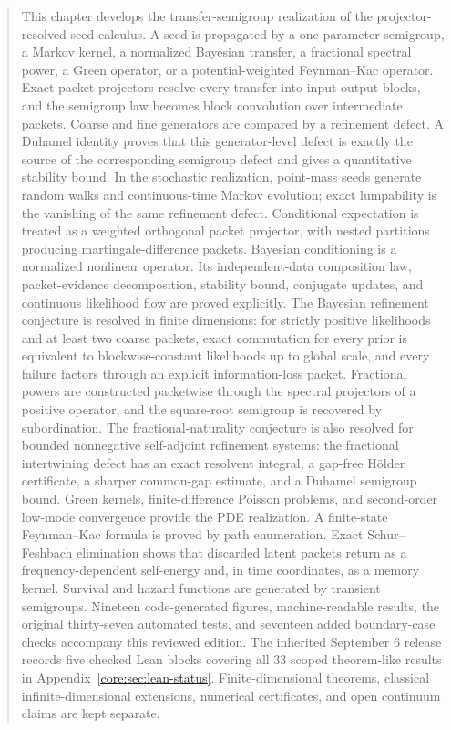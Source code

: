 \documentclass[11pt,letterpaper]{article}
\theoremstyle{plain}
\theoremstyle{plain}
\theoremstyle{plain}
\theoremstyle{definition}
\theoremstyle{definition}
\theoremstyle{definition}
\theoremstyle{definition}
\theoremstyle{definition}
\theoremstyle{remark}
\theoremstyle{remark}
\theoremstyle{remark}
\theoremstyle{remark}
\theoremstyle{remark}
\theoremstyle{remark}
\begin{document}
\begin{abstract}
This chapter develops the transfer-semigroup realization of the projector-resolved seed calculus. A seed is propagated by a one-parameter semigroup, a Markov kernel, a normalized Bayesian transfer, a fractional spectral power, a Green operator, or a potential-weighted Feynman--Kac operator. Exact packet projectors resolve every transfer into input-output blocks, and the semigroup law becomes block convolution over intermediate packets. Coarse and fine generators are compared by a refinement defect. A Duhamel identity proves that this generator-level defect is exactly the source of the corresponding semigroup defect and gives a quantitative stability bound. In the stochastic realization, point-mass seeds generate random walks and continuous-time Markov evolution; exact lumpability is the vanishing of the same refinement defect. Conditional expectation is treated as a weighted orthogonal packet projector, with nested partitions producing martingale-difference packets. Bayesian conditioning is a normalized nonlinear operator. Its independent-data composition law, packet-evidence decomposition, stability bound, conjugate updates, and continuous likelihood flow are proved explicitly.  The Bayesian refinement conjecture is resolved in finite dimensions: for strictly positive likelihoods and at least two coarse packets, exact commutation for every prior is equivalent to blockwise-constant likelihoods up to global scale, and every failure factors through an explicit information-loss packet. Fractional powers are constructed packetwise through the spectral projectors of a positive operator, and the square-root semigroup is recovered by subordination. The fractional-naturality conjecture is also resolved for bounded nonnegative self-adjoint refinement systems: the fractional intertwining defect has an exact resolvent integral, a gap-free Hölder certificate, a sharper common-gap estimate, and a Duhamel semigroup bound. Green kernels, finite-difference Poisson problems, and second-order low-mode convergence provide the PDE realization. A finite-state Feynman--Kac formula is proved by path enumeration. Exact Schur--Feshbach elimination shows that discarded latent packets return as a frequency-dependent self-energy and, in time coordinates, as a memory kernel. Survival and hazard functions are generated by transient semigroups. Nineteen code-generated figures, machine-readable results, the original thirty-seven automated tests, and seventeen added boundary-case checks accompany this reviewed edition. The inherited September 6 release records five checked Lean blocks covering all 33 scoped theorem-like results in Appendix~\ref{core:sec:lean-status}. Finite-dimensional theorems, classical infinite-dimensional extensions, numerical certificates, and open continuum claims are kept separate.
\end{abstract}
\end{document}
